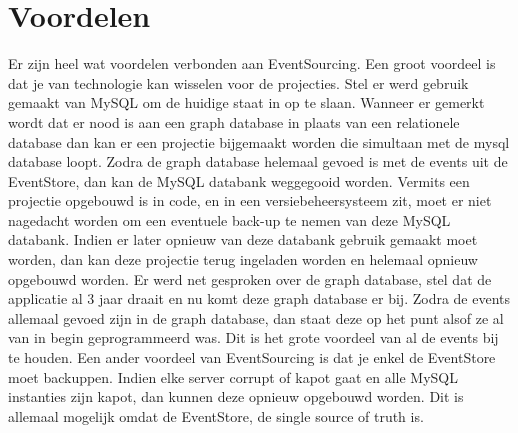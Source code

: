 
\section{Voordelen}
\label{sec:voordelen}

Er zijn heel wat voordelen verbonden aan EventSourcing. Een groot voordeel is dat je van technologie kan wisselen voor de projecties. Stel er werd gebruik gemaakt van MySQL om de huidige staat in op te slaan. Wanneer er gemerkt wordt dat er nood is aan een graph database in plaats van een relationele database dan kan er een projectie bijgemaakt worden die simultaan met de mysql database loopt. Zodra de graph database helemaal gevoed is met de events uit de EventStore, dan kan de MySQL databank weggegooid worden. Vermits een projectie opgebouwd is in code, en in een versiebeheersysteem zit, moet er niet nagedacht worden om een eventuele back-up te nemen van deze MySQL databank. Indien er later opnieuw van deze databank gebruik gemaakt moet worden, dan kan deze projectie terug ingeladen worden en helemaal opnieuw opgebouwd worden.
Er werd net gesproken over de graph database, stel dat de applicatie al 3 jaar draait en nu komt deze graph database er bij. Zodra de events allemaal gevoed zijn in de graph database, dan staat deze op het punt alsof ze al van in begin geprogrammeerd was. Dit is het grote voordeel van al de events bij te houden.
Een ander voordeel van EventSourcing is dat je enkel de EventStore moet backuppen. Indien elke server corrupt of kapot gaat en alle MySQL instanties zijn kapot, dan kunnen deze opnieuw opgebouwd worden. Dit is allemaal mogelijk omdat de EventStore, de single source of truth is.